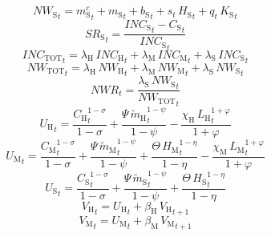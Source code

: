 \begin{dmath}
{NW_\mathrm{S}}_{t}={m^c_\mathrm{S}}_{t}+{m_\mathrm{S}}_{t}+{b_\mathrm{S}}_{t}+{s}_{t}\, {H_\mathrm{S}}_{t}+{q}_{t}\, {K_\mathrm{S}}_{t}
\end{dmath}
\begin{dmath}
{SR_\mathrm{S}}_{t}=\frac{{INC_\mathrm{S}}_{t}-{C_\mathrm{S}}_{t}}{{INC_\mathrm{S}}_{t}}
\end{dmath}
\begin{dmath}
{INC_\mathrm{TOT}}_{t}={\lambda_\mathrm{H}}\, {INC_\mathrm{H}}_{t}+{\lambda_\mathrm{M}}\, {INC_\mathrm{M}}_{t}+{\lambda_\mathrm{S}}\, {INC_\mathrm{S}}_{t}
\end{dmath}
\begin{dmath}
{NW_\mathrm{TOT}}_{t}={\lambda_\mathrm{H}}\, {NW_\mathrm{H}}_{t}+{\lambda_\mathrm{M}}\, {NW_\mathrm{M}}_{t}+{\lambda_\mathrm{S}}\, {NW_\mathrm{S}}_{t}
\end{dmath}
\begin{dmath}
{NWR}_{t}=\frac{{\lambda_\mathrm{S}}\, {NW_\mathrm{S}}_{t}}{{NW_\mathrm{TOT}}_{t}}
\end{dmath}
\begin{dmath}
{U_\mathrm{H}}_{t}=\frac{{C_\mathrm{H}}_{t}^{1-{\sigma}}}{1-{\sigma}}+\frac{{\Psi}\, {\widetilde{m}_\mathrm{H}}_{t}^{1-{\psi}}}{1-{\psi}}-\frac{{\chi_\mathrm{H}}\, {L_\mathrm{H}}_{t}^{1+{\varphi}}}{1+{\varphi}}
\end{dmath}
\begin{dmath}
{U_\mathrm{M}}_{t}=\frac{{C_\mathrm{M}}_{t}^{1-{\sigma}}}{1-{\sigma}}+\frac{{\Psi}\, {\widetilde{m}_\mathrm{M}}_{t}^{1-{\psi}}}{1-{\psi}}+\frac{{\Theta}\, {H_\mathrm{M}}_{t}^{1-{\eta}}}{1-{\eta}}-\frac{{\chi_\mathrm{M}}\, {L_\mathrm{M}}_{t}^{1+{\varphi}}}{1+{\varphi}}
\end{dmath}
\begin{dmath}
{U_\mathrm{S}}_{t}=\frac{{C_\mathrm{S}}_{t}^{1-{\sigma}}}{1-{\sigma}}+\frac{{\Psi}\, {\widetilde{m}_\mathrm{S}}_{t}^{1-{\psi}}}{1-{\psi}}+\frac{{\Theta}\, {H_\mathrm{S}}_{t}^{1-{\eta}}}{1-{\eta}}
\end{dmath}
\begin{dmath}
{V_\mathrm{H}}_{t}={U_\mathrm{H}}_{t}+{\beta_\mathrm{H}}\, {V_\mathrm{H}}_{t+1}
\end{dmath}
\begin{dmath}
{V_\mathrm{M}}_{t}={U_\mathrm{M}}_{t}+{\beta_\mathrm{M}}\, {V_\mathrm{M}}_{t+1}
\end{dmath}
